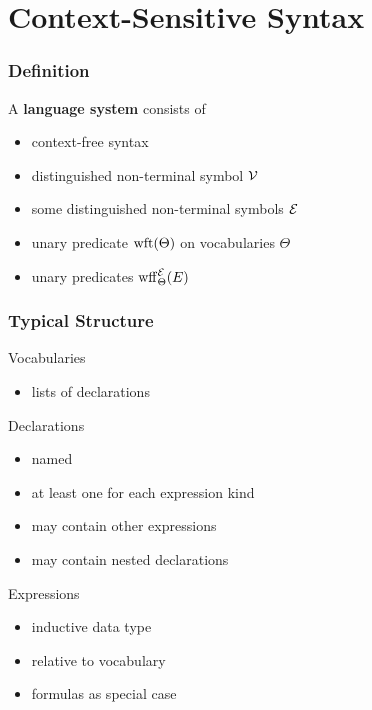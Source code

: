 \section{Context-Sensitive Syntax}

\begin{frame}\frametitle{Definition}
A \textbf{language system} consists of
\begin{itemize}
 \item context-free syntax
 \item distinguished non-terminal symbol $\mathcal{V}$ 
 \item some distinguished non-terminal symbols $\mathcal{E}$ 
 \item unary predicate $\mathrm{wft}(\Theta)$ on vocabularies $\Theta$ 
 \item unary predicates $\mathrm{wff}_{\Theta}^{\mathcal{E}}(E)$ 
\end{itemize}
\end{frame}

\begin{frame}\frametitle{Typical Structure}
Vocabularies
\begin{itemize}
\item lists of declarations
\end{itemize}

Declarations
\begin{itemize}
\item named
\item at least one for each expression kind
\item may contain other expressions 
\item may contain nested declarations 
\end{itemize}

Expressions
\begin{itemize}
\item inductive data type
\item relative to vocabulary 
\item formulas as special case
\end{itemize}
\end{frame}

